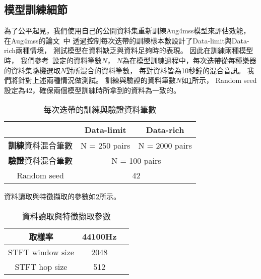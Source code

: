 \documentclass[class=NCU_thesis, crop=false]{standalone}
\begin{document}
\subsection{模型訓練細節} \label{training-dataset-processing}
為了公平起見，我們使用自己的公開資料集重新訓練Aug4mss模型來評估效能，
在Aug4mss的論文~\cite{Chiu_ChingYu2020MixingSpecific}中
透過控制每次迭帶的訓練樣本數設計了Data-limit與Data-rich兩種情境，
測試模型在資料缺乏與資料足夠時的表現。
因此在訓練兩種模型時，
我們參考~\cite{Chiu_ChingYu2020MixingSpecific}設定的資料筆數$N$，
$N$為在模型訓練過程中，每次迭帶從每種樂器的資料集隨機選取$N$對所混合的資料筆數，
每對資料皆為10秒鐘的混合音訊。
我們將針對上述兩種情況做測試。
訓練與驗證的資料筆數$N$如\cref{table:table-training-dataset-split}所示，
Random seed設定為42，確保兩個模型訓練時所拿到的資料為一致的。
\begin{table}[h]
    \centering
    \caption{每次迭帶的訓練與驗證資料筆數}
    \label{table:table-training-dataset-split}
    \begin{tabular}{|c|c|c|}
        \hline
        \multicolumn{1}{|c|}{} & \multicolumn{1}{|c|}{Data-limit} & \multicolumn{1}{|c|}{Data-rich} \\
        \hline
        \textbf{訓練}資料混合筆數 & N = 250 pairs & N = 2000 pairs \\
        \hline
        \textbf{驗證}資料混合筆數 & \multicolumn{2}{|c|}{N = 100 pairs} \\
        \hline
        Random seed & \multicolumn{2}{|c|}{42} \\
        \hline
    \end{tabular}
\end{table}

資料讀取與特徵擷取的參數如\cref{table:table-data-load-parameters}所示。
\begin{table}[H]
    \centering
    \caption{資料讀取與特徵擷取參數}
    \label{table:table-data-load-parameters}
    \begin{tabular}{|c|c|c|}
        \hline
        \multicolumn{1}{|c|}{取樣率} & \multicolumn{1}{|c|}{44100Hz} \\
        \hline
        STFT window size & 2048 \\
        \hline
        STFT hop size & 512 \\
        \hline
    \end{tabular}
\end{table}
\end{document}
